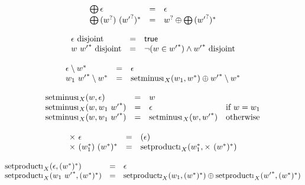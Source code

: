 $$
\begin{array}[t]{@{}lcl@{}l@{}}
{\bigoplus}\, \epsilon & = & \epsilon \\
{\bigoplus}\, ({w^?})~{({{w'}^?})^\ast} & = & {w^?} \oplus {\bigoplus}\, {({{w'}^?})^\ast} \\
\end{array}
$$

\vspace{1ex}

$$
\begin{array}[t]{@{}lcl@{}l@{}}
\epsilon~{\mathrm{disjoint}} & = & \mathsf{true} \\
w~{{w'}^\ast}~{\mathrm{disjoint}} & = & {\neg(w \in {{w'}^\ast})} \land {{w'}^\ast}~{\mathrm{disjoint}} \\
\end{array}
$$

$$
\begin{array}[t]{@{}lcl@{}l@{}}
\epsilon \setminus {w^\ast} & = & \epsilon \\
w_1~{{w'}^\ast} \setminus {w^\ast} & = & {{\mathrm{setminus{\kern-0.1em\scriptstyle 1}}}}_{X}(w_1, {w^\ast}) \oplus {{w'}^\ast} \setminus {w^\ast} \\
\end{array}
$$

$$
\begin{array}[t]{@{}lcl@{}l@{}}
{{\mathrm{setminus{\kern-0.1em\scriptstyle 1}}}}_{X}(w, \epsilon) & = & w \\
{{\mathrm{setminus{\kern-0.1em\scriptstyle 1}}}}_{X}(w, w_1~{{w'}^\ast}) & = & \epsilon & \quad \mbox{if}~ w = w_1 \\
{{\mathrm{setminus{\kern-0.1em\scriptstyle 1}}}}_{X}(w, w_1~{{w'}^\ast}) & = & {{\mathrm{setminus{\kern-0.1em\scriptstyle 1}}}}_{X}(w, {{w'}^\ast}) & \quad \mbox{otherwise} \\
\end{array}
$$

$$
\begin{array}[t]{@{}lcl@{}l@{}}
{\Large\times}~\epsilon & = & (\epsilon) \\
{\Large\times}~({w_1^\ast})~{({w^\ast})^\ast} & = & {{\mathrm{setproduct{\kern-0.1em\scriptstyle 1}}}}_{X}({w_1^\ast}, {\Large\times}~{({w^\ast})^\ast}) \\
\end{array}
$$

$$
\begin{array}[t]{@{}lcl@{}l@{}}
{{\mathrm{setproduct{\kern-0.1em\scriptstyle 1}}}}_{X}(\epsilon, {({w^\ast})^\ast}) & = & \epsilon \\
{{\mathrm{setproduct{\kern-0.1em\scriptstyle 1}}}}_{X}(w_1~{{w'}^\ast}, {({w^\ast})^\ast}) & = & {{\mathrm{setproduct{\kern-0.1em\scriptstyle 2}}}}_{X}(w_1, {({w^\ast})^\ast}) \oplus {{\mathrm{setproduct{\kern-0.1em\scriptstyle 1}}}}_{X}({{w'}^\ast}, {({w^\ast})^\ast}) \\
\end{array}
$$

